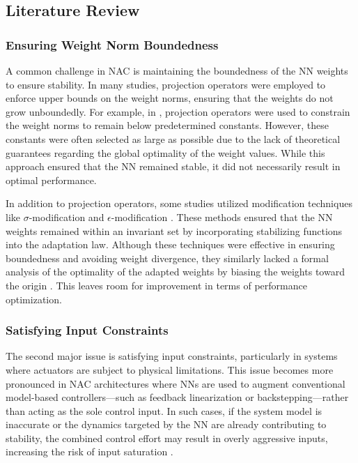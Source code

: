 \documentclass[letterpaper, journal]{IEEEtran}
\begin{document}
\subsection{Literature Review}

\subsubsection{Ensuring Weight Norm Boundedness}

A common challenge in NAC is maintaining the boundedness of the NN weights to ensure stability. 
In many studies, projection operators were employed to enforce upper bounds on the weight norms, ensuring that the weights do not grow unboundedly. 
For example, in \cite{Zhou:2023aa,Griffis:2023aa,Patil:2022aa}, projection operators were used to constrain the weight norms to remain below predetermined constants. 
However, these constants were often selected as large as possible due to the lack of theoretical guarantees regarding the global optimality of the weight values. 
While this approach ensured that the NN remained stable, it did not necessarily result in optimal performance.

In addition to projection operators, some studies utilized modification techniques like $\sigma$-modification \cite{Ge:2002aa} and $\epsilon$-modification \cite{Esfandiari:2015aa,Gao:2006aa}. 
These methods ensured that the NN weights remained within an invariant set by incorporating stabilizing functions into the adaptation law. 
Although these techniques were effective in ensuring boundedness and avoiding weight divergence, they similarly lacked a formal analysis of the optimality of the adapted weights by biasing the weights toward the origin \cite{Ryu:2024aa}.
This leaves room for improvement in terms of performance optimization.

\hfill

\subsubsection{Satisfying Input Constraints}

The second major issue is satisfying input constraints, particularly in systems where actuators are subject to physical limitations. 
This issue becomes more pronounced in NAC architectures where NNs are used to augment conventional model-based controllers—such as feedback linearization or backstepping—rather than acting as the sole control input. 
In such cases, if the system model is inaccurate or the dynamics targeted by the NN are already contributing to stability, the combined control effort may result in overly aggressive inputs, increasing the risk of input saturation \cite{Khalil:2002aa}.
\end{document}
